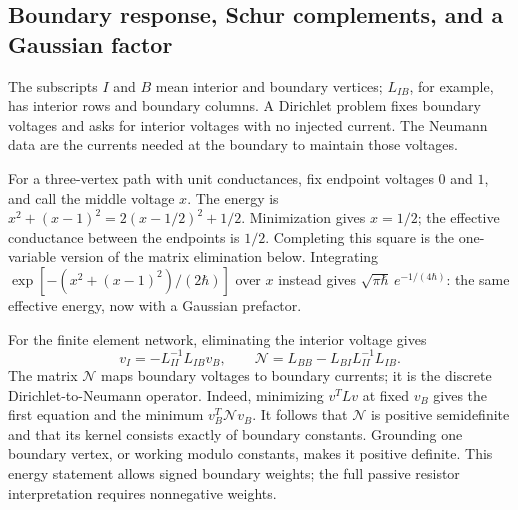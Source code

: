 \subsection{Boundary response, Schur complements, and a Gaussian factor}
\label{subsec:ipolyResponse}

The subscripts $I$ and $B$ mean interior and boundary vertices;
$L_{IB}$, for example, has interior rows and boundary columns.
A Dirichlet problem fixes boundary voltages and asks for interior
voltages with no injected current. The Neumann data are the currents
needed at the boundary to maintain those voltages.

For a three-vertex path with unit conductances, fix endpoint voltages
$0$ and $1$, and call the middle voltage $x$. The energy is
$x^2+(x-1)^2=2(x-1/2)^2+1/2$. Minimization gives $x=1/2$;
the effective conductance between the endpoints is $1/2$.
Completing this square is the one-variable version of the matrix
elimination below. Integrating $\exp[-(x^2+(x-1)^2)/(2\hbar)]$
over $x$ instead gives $\sqrt{\pi\hbar}\,e^{-1/(4\hbar)}$:
the same effective energy, now with a Gaussian prefactor.

For the finite element network, eliminating the interior voltage gives
\begin{equation}
 v_I=-L_{II}^{-1}L_{IB}v_B,\qquad
 \mathcal N=L_{BB}-L_{BI}L_{II}^{-1}L_{IB}.
 \label{eq:ipolyDtN}
\end{equation}
The matrix $\mathcal N$ maps boundary voltages to boundary currents;
it is the discrete Dirichlet-to-Neumann operator. Indeed, minimizing
$v^TLv$ at fixed $v_B$ gives the first equation and the minimum
$v_B^T\mathcal N v_B$. It follows that $\mathcal N$ is positive
semidefinite and that its kernel consists exactly of boundary constants.
Grounding one boundary vertex, or working modulo constants, makes it
positive definite. This energy statement allows signed boundary weights;
the full passive resistor interpretation requires nonnegative weights.


